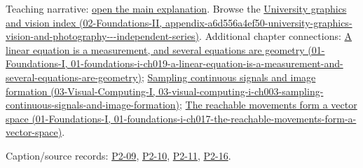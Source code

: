Teaching narrative: \hyperref[04-visual-computing-ii-ch033-additive-structure-explains-repeated-coincidences]{open the main explanation}. Browse the \href{../02-Foundations-II/main.pdf\#nameddest=appendix-a6d556a4ef50-university-graphics-vision-and-photography---independent-series}{University graphics and vision index (02-Foundations-II, appendix-a6d556a4ef50-university-graphics-vision-and-photography-\/-\/-independent-series)}. Additional chapter connections: \href{../01-Foundations-I/main.pdf\#nameddest=01-foundations-i-ch019-a-linear-equation-is-a-measurement-and-several-equations-are-geometry}{A linear equation is a measurement, and several equations are geometry (01-Foundations-I, 01-foundations-i-ch019-a-linear-equation-is-a-measurement-and-several-equations-are-geometry)}; \href{../03-Visual-Computing-I/main.pdf\#nameddest=03-visual-computing-i-ch003-sampling-continuous-signals-and-image-formation}{Sampling continuous signals and image formation (03-Visual-Computing-I, 03-visual-computing-i-ch003-sampling-continuous-signals-and-image-formation)}; \href{../01-Foundations-I/main.pdf\#nameddest=01-foundations-i-ch017-the-reachable-movements-form-a-vector-space}{The reachable movements form a vector space (01-Foundations-I, 01-foundations-i-ch017-the-reachable-movements-form-a-vector-space)}.

Caption/source records: \hyperref[04-visual-computing-ii-ch036-p2-09---lecture-09-reflections-on-the-szemeredi-trotter-theorem]{P2-09}, \hyperref[04-visual-computing-ii-ch036-p2-10---lecture-10-sum-product-theory]{P2-10}, \hyperref[04-visual-computing-ii-ch036-p2-11---lecture-11-contagious-structure-in-projection-theory]{P2-11}, \hyperref[04-visual-computing-ii-ch036-p2-16---lecture-16-the-bourgain-projection-theorem-part-3]{P2-16}.
